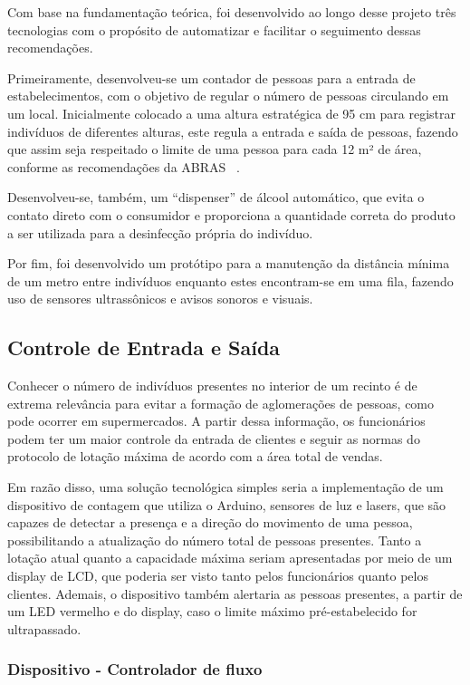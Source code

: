 \documentclass[10pt,twocolumn,letterpaper]{article}
\begin{document}
Com base na fundamentação teórica, foi desenvolvido ao longo desse projeto três tecnologias com o propósito de automatizar e facilitar o seguimento dessas recomendações. 

Primeiramente, desenvolveu-se um contador de pessoas para a entrada de estabelecimentos,  com o objetivo de regular o número de pessoas circulando em um local. Inicialmente colocado a uma altura estratégica de 95 cm para registrar indivíduos de diferentes alturas, este regula a entrada e saída de pessoas, fazendo que assim seja respeitado o limite de uma pessoa para cada 12 m² de área, conforme as recomendações da ABRAS ~\cite{6}.

Desenvolveu-se, também, um “dispenser” de álcool automático, que evita o contato direto com o consumidor e proporciona a quantidade correta do produto a ser utilizada para a desinfecção própria do indivíduo.

Por fim, foi desenvolvido um protótipo para a manutenção da distância mínima de um metro entre indivíduos enquanto estes encontram-se em uma fila, fazendo uso de sensores ultrassônicos e avisos sonoros e visuais.

\subsection{Controle de Entrada e Saída}

Conhecer o número de indivíduos presentes no interior de um recinto é de extrema relevância para evitar a formação de aglomerações de pessoas, como pode ocorrer em supermercados. A partir dessa informação, os funcionários podem ter um maior controle da entrada de clientes e seguir as normas do protocolo de lotação máxima de acordo com a área total de vendas. 

Em razão disso, uma solução tecnológica simples seria a implementação de um dispositivo de contagem que utiliza o Arduino, sensores de luz e lasers, que são capazes de detectar a presença e a direção do movimento de uma pessoa, possibilitando a atualização do número total de pessoas presentes. Tanto a lotação atual quanto a capacidade máxima seriam apresentadas por meio de um display de LCD, que poderia ser visto tanto pelos funcionários quanto pelos clientes. Ademais, o dispositivo também alertaria as pessoas presentes, a partir de um LED vermelho e do display, caso o limite máximo pré-estabelecido for ultrapassado.

\subsubsection{Dispositivo - Controlador de fluxo}
\end{document}
